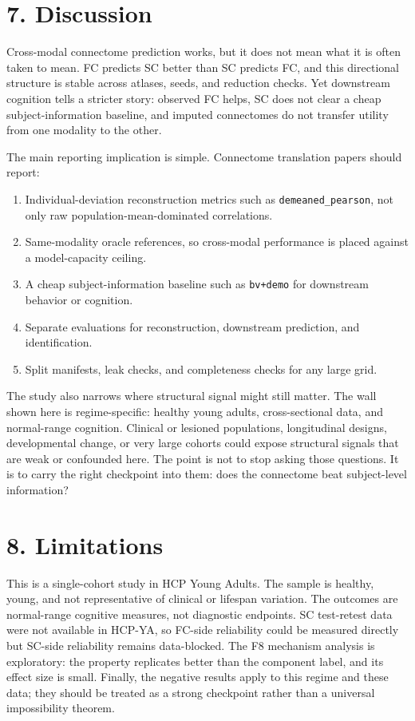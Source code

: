\section{7. Discussion}\label{7-discussion}

Cross-modal connectome prediction works, but it does not mean what it is often taken to mean. FC predicts SC better than SC predicts FC, and this directional structure is stable across atlases, seeds, and reduction checks. Yet downstream cognition tells a stricter story: observed FC helps, SC does not clear a cheap subject-information baseline, and imputed connectomes do not transfer utility from one modality to the other.

The main reporting implication is simple. Connectome translation papers should report:

\begin{enumerate}
\def\labelenumi{\arabic{enumi}.}
\tightlist
\item
  Individual-deviation reconstruction metrics such as \texttt{demeaned\_pearson}, not only raw population-mean-dominated correlations.
\item
  Same-modality oracle references, so cross-modal performance is placed against a model-capacity ceiling.
\item
  A cheap subject-information baseline such as \texttt{bv+demo} for downstream behavior or cognition.
\item
  Separate evaluations for reconstruction, downstream prediction, and identification.
\item
  Split manifests, leak checks, and completeness checks for any large grid.
\end{enumerate}

The study also narrows where structural signal might still matter. The wall shown here is regime-specific: healthy young adults, cross-sectional data, and normal-range cognition. Clinical or lesioned populations, longitudinal designs, developmental change, or very large cohorts could expose structural signals that are weak or confounded here. The point is not to stop asking those questions. It is to carry the right checkpoint into them: does the connectome beat subject-level information?

\section{8. Limitations}\label{8-limitations}

This is a single-cohort study in HCP Young Adults. The sample is healthy, young, and not representative of clinical or lifespan variation. The outcomes are normal-range cognitive measures, not diagnostic endpoints. SC test-retest data were not available in HCP-YA, so FC-side reliability could be measured directly but SC-side reliability remains data-blocked. The F8 mechanism analysis is exploratory: the property replicates better than the component label, and its effect size is small. Finally, the negative results apply to this regime and these data; they should be treated as a strong checkpoint rather than a universal impossibility theorem.

